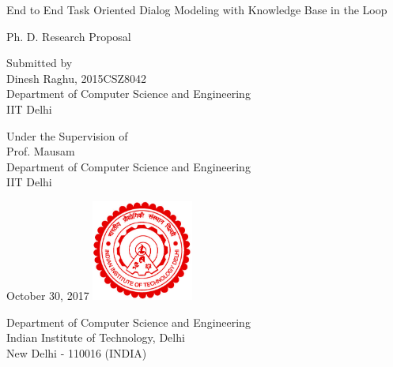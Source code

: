 \begin{titlepage}
\begin{center}

\LARGE
End to End Task Oriented Dialog Modeling with Knowledge Base in the Loop

\vspace{0.5cm}
\Large
Ph. D. Research Proposal

\vspace{0.5cm}
\vfill
\large
Submitted by\\
\Large
Dinesh Raghu, 2015CSZ8042\\
\large
Department of Computer Science and Engineering\\
IIT Delhi

\vspace{0.5cm}
\vfill
\large
Under the Supervision of\\
\Large
Prof. Mausam\\
\large
Department of Computer Science and Engineering\\
IIT Delhi

\vspace{0.5cm}
\vfill
\large
October 30, 2017
\vspace{0.5cm}
\vfill
\includegraphics[width=0.25\textwidth]{assets/figures/Logo-IITD.jpg}

\vspace{0.5cm}
\large
Department of Computer Science and Engineering\\
Indian Institute of Technology, Delhi\\
New Delhi - 110016 (INDIA)\\

\end{center}
\end{titlepage}
